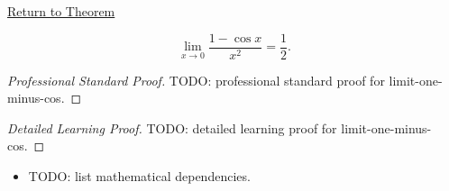 \newpage
{}
\label{prf:limit-one-minus-cos}

\begin{remark*}[Return]
\hyperref[prop:limit-one-minus-cos]{Return to Theorem}
\end{remark*}

\begin{theorem*}
\[
  \lim_{x \to 0} \frac{1 - \cos x}{x^2} = \frac{1}{2}.
\]

\smallskip\noindent
\end{theorem*}

\begin{proof}[Professional Standard Proof]
\LRAProofBodyStart
TODO: professional standard proof for limit-one-minus-cos.
\end{proof}

\begin{proof}[Detailed Learning Proof]
\LRAProofBodyStart
TODO: detailed learning proof for limit-one-minus-cos.
\end{proof}

\begin{remark*}
\end{remark*}

\begin{dependencies}
\begin{itemize}
  \item TODO: list mathematical dependencies.
\end{itemize}
\end{dependencies}

\clearpage

